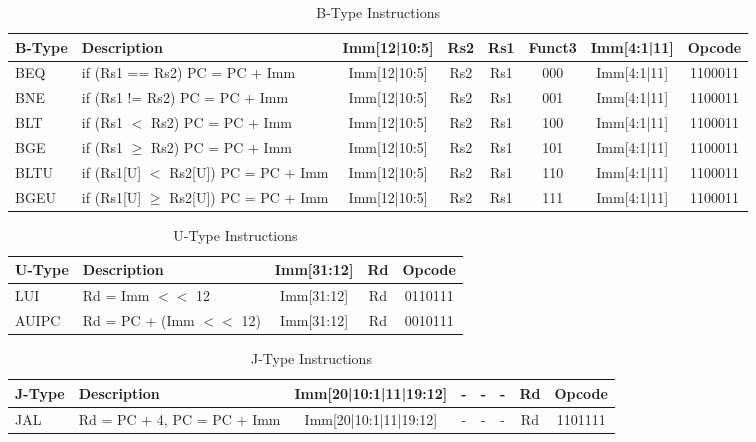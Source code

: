 \documentclass[12pt,a4paper]{report}
\begin{document}
\vspace{1.5em}

\begin{longtable}{|l|p{5cm}|c|c|c|c|c|c|}
\caption{B-Type Instructions} \\
\hline
\textbf{B-Type} & \textbf{Description} & \textbf{Imm[12|10:5]} & \textbf{Rs2} & \textbf{Rs1} & \textbf{Funct3} & \textbf{Imm[4:1|11]} & \textbf{Opcode} \\
\hline
\endfirsthead
\hline
\endlastfoot

BEQ & if (Rs1 == Rs2) PC = PC + Imm & Imm[12|10:5] & Rs2 & Rs1 & 000 & Imm[4:1|11] & 1100011 \\
\hline
BNE & if (Rs1 != Rs2) PC = PC + Imm & Imm[12|10:5] & Rs2 & Rs1 & 001 & Imm[4:1|11] & 1100011 \\
\hline
BLT & if (Rs1 $<$ Rs2) PC = PC + Imm & Imm[12|10:5] & Rs2 & Rs1 & 100 & Imm[4:1|11] & 1100011 \\
\hline
BGE & if (Rs1 $\geq$ Rs2) PC = PC + Imm & Imm[12|10:5] & Rs2 & Rs1 & 101 & Imm[4:1|11] & 1100011 \\
\hline
BLTU & if (Rs1[U] $<$ Rs2[U]) PC = PC + Imm & Imm[12|10:5] & Rs2 & Rs1 & 110 & Imm[4:1|11] & 1100011 \\
\hline
BGEU & if (Rs1[U] $\geq$ Rs2[U]) PC = PC + Imm & Imm[12|10:5] & Rs2 & Rs1 & 111 & Imm[4:1|11] & 1100011 \\
\hline
\end{longtable}

\vspace{1.5em}

\begin{longtable}{|l|p{6cm}|c|c|c|c|c|c|}
\caption{U-Type Instructions} \\
\hline
\textbf{U-Type} & \textbf{Description} & \multicolumn{4}{c|}{\textbf{Imm[31:12]}} & \textbf{Rd} & \textbf{Opcode} \\
\hline
\endfirsthead
\hline
\endlastfoot

LUI & Rd = Imm $<<$ 12 & \multicolumn{4}{c|}{Imm[31:12]} & Rd & 0110111 \\
\hline
AUIPC & Rd = PC + (Imm $<<$ 12) & \multicolumn{4}{c|}{Imm[31:12]} & Rd & 0010111 \\
\hline
\end{longtable}

\vspace{1.5em}

\begin{longtable}{|l|p{6cm}|c|c|c|c|c|c|}
\caption{J-Type Instructions} \\
\hline
\textbf{J-Type} & \textbf{Description} & \textbf{Imm[20|10:1|11|19:12]} & \textbf{-} & \textbf{-} & \textbf{-} & \textbf{Rd} & \textbf{Opcode} \\
\hline
\endfirsthead
\hline
\endlastfoot

JAL & Rd = PC + 4, PC = PC + Imm & Imm[20|10:1|11|19:12] & - & - & - & Rd & 1101111 \\
\hline
\end{longtable}
\end{document}

